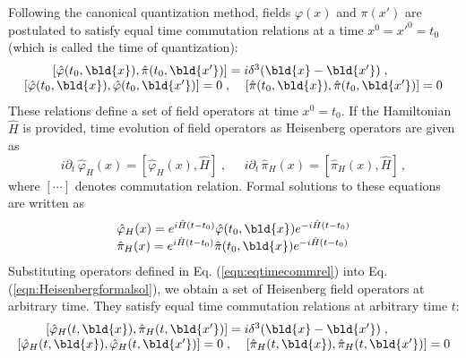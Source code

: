 Following the canonical quantization method, 
fields $\varphi(x)$ and $\pi(x')$ 
are postulated to satisfy equal time commutation relations
at a time $x^0 = x'^0 = t_0$ (which is called the time of quantization):
\begin{equation}
\begin{array}{l}
\hspace{8mm}
[ \hat{\varphi}(t_0, \bld{x}), \hat{\pi}(t_0, \bld{x'})] = i \delta^3 (\bld{x} - \bld{x'} )\;,
\\
\left[ \hat{\varphi}(t_0, \bld{x}), \hat{\varphi}(t_0, \bld{x'}) \right] = 0\;,\;\;\;\;
\left[ \hat{\pi}(t_0, \bld{x}), \hat{\pi}(t_0, \bld{x'}) \right] = 0
\end{array}
\label{eqn:eqtimecommrel}
\end{equation}
These relations define a set of field operators at time $x^0 = t_0$.
If the Hamiltonian $\hat{H}$ is provided,
time evolution of field operators as Heisenberg operators are given as
\begin{equation}
i \partial_t \, \hat{\varphi}_H(x) =  [\hat{\varphi}_H(x), \hat{H} ]\;, \; \; \; \; \; 
i \partial_t \, \hat{\pi}_H(x) = [\hat{\pi}_H(x), \hat{H} ]\,,
\label{eqn:HeisenbergEOM}
\end{equation}
where $[\cdots]$ denotes commutation relation.
Formal solutions to these equations are
written as 
\begin{equation}
\begin{array}{l}
\hat{\varphi}_H(x) = e^{i\hat{H}(t-t_0)} \hat{\varphi}(t_0, \bld{x}) e^{-i\hat{H}(t-t_0)} \\
\hat{\pi}_H(x) = e^{i\hat{H}(t-t_0)} \hat{\pi}(t_0, \bld{x}) e^{-i\hat{H}(t-t_0)} 
\end{array}
\label{eqn:Heisenbergformalsol}
\end{equation}
Substituting operators defined in 
Eq. (\ref{eqn:eqtimecommrel}) into
Eq. (\ref{eqn:Heisenbergformalsol}),
we obtain a set of Heisenberg field operators at arbitrary time. They satisfy
equal time commutation relations at arbitrary time $t$:
\begin{equation}
\begin{array}{l}
\hspace{8mm}
[ \hat{\varphi}_H(t, \bld{x}), \hat{\pi}_H(t, \bld{x'})] = i \delta^3 (\bld{x} - \bld{x'} )\;,
\\
\left[ \hat{\varphi}_H(t, \bld{x}), \hat{\varphi}_H(t, \bld{x'}) \right] = 0\;,\;\;\;\;
\left[ \hat{\pi}_H(t, \bld{x}), \hat{\pi}_H(t, \bld{x'}) \right] = 0
\end{array}
\label{eqn:eqtimecommrelHeisenberg}
\end{equation}
